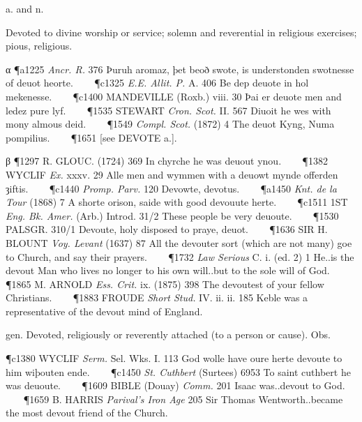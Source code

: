 \begin{description}[wide, labelwidth=!, labelindent=0pt]
\begin{myenumerate}
\end{myenumerate}

 a. and n.

\noindent {}

\noindent [ME. devot, devout, a. OF. devot, devote (12th c. in Littré), = Pr.
devot, Sp. devoto, It. divoto, ad. L. dēvōt-us devoted, given up by vow, pa.
pple. of dēvovēre to devote. The close OF. ō became the vowel ou (\phonetic{uː}) in ME., whence the modern diphthong ou; but a form in ō, Sc. oi, was also in use: see devote a.]
\vspace{-0.3cm}

\begin{myenumerate}

 Devoted to divine worship or service; solemn and reverential in religious exercises; pious, religious.

α \P a1225  \textit{Ancr. R.} 376 Þuruh aromaz, þet beoð swote, is understonden swotnesse of deuot heorte.    
\P c1325  \textit{E.E. Allit. P.} A. 406 Be dep deuote in hol mekenesse.    
\P c1400 MANDEVILLE (Roxb.) viii. 30 Þai er deuote men and ledez pure lyf.    
\P 1535 STEWART  \textit{Cron. Scot.} II. 567 Diuoit he wes with mony almous deid.    
\P 1549  \textit{Compl. Scot.} (1872) 4 The deuot Kyng, Numa pompilius.    
\P 1651 [see DEVOTE a.].

β \P 1297 R. GLOUC.  (1724) 369 In chyrche he was deuout ynou.    
\P 1382 WYCLIF  \textit{Ex.} xxxv. 29 Alle men and wymmen with a deuowt mynde offerden ȝiftis.    
\P c1440  \textit{Promp. Parv.} 120 Devowte, devotus.    
\P a1450  \textit{Knt. de la Tour} (1868) 7 A shorte orison, saide with good devouute herte.    
\P c1511 1ST  \textit{Eng. Bk. Amer.} (Arb.) Introd. 31/2 These people be very deuoute.    
\P 1530 PALSGR. 310/1 Devoute, holy disposed to praye, deuot.    
\P 1636 SIR H. BLOUNT  \textit{Voy. Levant} (1637) 87 All the devouter sort (which are not many) goe to Church, and say their prayers.    
\P 1732  \textit{Law Serious} C. i. (ed. 2) 1 He..is the devout Man who lives no longer to his own will..but to the sole will of God.    
\P 1865 M. ARNOLD  \textit{Ess. Crit.} ix. (1875) 398 The devoutest of your fellow Christians.    
\P 1883 FROUDE  \textit{Short Stud.} IV. ii. ii. 185 Keble was a representative of the devout mind of England.

 gen. Devoted, religiously or reverently attached (to a person or cause). Obs.

\P c1380 WYCLIF  \textit{Serm.} Sel. Wks. I. 113 God wolle have oure herte devoute to him wiþouten ende.    
\P c1450  \textit{St. Cuthbert} (Surtees) 6953 To saint cuthbert he was deuoute.    
\P 1609 BIBLE (Douay)  \textit{Comm.} 201 Isaac was..devout to God.    
\P 1659 B. HARRIS  \textit{Parival's Iron Age} 205 Sir Thomas Wentworth..became the most devout friend of the Church.


\end{myenumerate}
\end{description}
